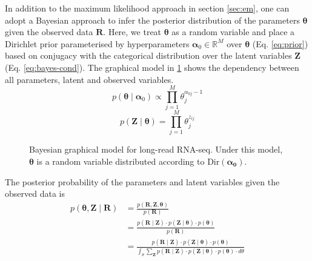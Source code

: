 In addition to the maximum likelihood approach in section \ref{sec:em}, one can adopt a Bayesian approach to infer the posterior distribution of the parameters $\bm\theta$ given the observed data $\bm{R}$. Here, we treat $\bm\theta$ as a random variable and place a Dirichlet prior parameterised by hyperparameters $\bm\alpha_0\in\mathbb{R}^{M}$ over $\bm{\theta}$ (Eq. \ref{eq:prior}) based on conjugacy with the categorical distribution over the latent variables $\bm{Z}$  (Eq. \ref{eq:bayes-cond}). The graphical model in \ref{fig:graphical-model-2} shows the dependency between all parameters, latent and observed variables.  
\begin{equation}\label{eq:prior}
    p(\bm\theta\mid\bm\alpha_0)\propto \prod_{j=1}^M \theta_j^{\alpha_{0j}-1}
\end{equation}
\begin{equation}\label{eq:bayes-cond}
    p(\bm{Z}\mid\bm\theta)=\prod_{j=1}^M\theta_j^{z_{ij}}
\end{equation}
\begin{figure}[H]
    \centering
    \caption[Bayesian graphical model for long-read RNA-seq]{Bayesian graphical model for long-read RNA-seq. Under this model, $\bm\theta$ is a random variable distributed according to $\textrm{Dir}(\bm{\alpha_0})$.}
    \label{fig:graphical-model-2}
\end{figure}
\noindent The posterior probability of the parameters and latent variables given the observed data is 
\begin{equation}\label{eq:post-full}
\begin{split}
    p(\bm{\theta},\bm{Z}\mid\bm{R}) & =\frac{p(\bm{R},\bm{Z},\bm{\theta})}{p(\bm{R})} \\
    & = \frac{p(\bm{R}\mid\bm{Z})\cdot p(\bm{Z}\mid\bm{\theta})\cdot p(\bm{\theta})}{p(\bm{R})} \\
    & = \frac{p(\bm{R}\mid\bm{Z})\cdot p(\bm{Z}\mid\bm{\theta})\cdot p(\bm{\theta})}{\int_\theta \sum_{\bm{Z}} p(\bm{R}\mid\bm{Z})\cdot p(\bm{Z}\mid\bm{\theta})\cdot p(\bm{\theta})\cdot d\theta}
\end{split}
\end{equation}
